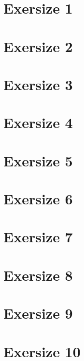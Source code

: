 \documentclass[twoside, a4paper, fleqn, reqno]{article}
\begin{document}
\maketitle

\section*{Exersize 1}

\section*{Exersize 2}

\section*{Exersize 3}

\section*{Exersize 4}

\section*{Exersize 5}

\section*{Exersize 6}

\section*{Exersize 7}

\section*{Exersize 8}

\section*{Exersize 9}

\section*{Exersize 10}
\end{document}
